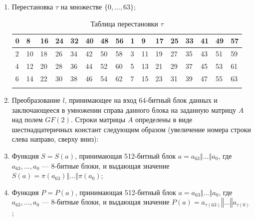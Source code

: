 \documentclass{./civarticle}
\begin{document}
\begin{enumerate}
    \item Перестановка $\tau$ на множестве $\{0, ..., 63 \}$;
    
    \begin{longtable}{|p{0.5cm}|p{0.5cm}|p{0.5cm}|p{0.5cm}|p{0.5cm}|p{0.5cm}|p{0.5cm}|p{0.5cm}|p{0.5cm}|p{0.5cm}|p{0.5cm}|p{0.5cm}|p{0.5cm}|p{0.5cm}|p{0.5cm}|p{0.5cm}|}
    \hline
    0 & 8 & 16 & 24 & 32 & 40 & 48 & 56 & 1 & 9 & 17 & 25 & 33 & 41 & 49 & 57 \\
    \hline
    2 & 10 & 18 & 26 & 34 & 42 & 50 & 58 & 3 & 11 & 19 & 27 & 35 & 43 & 51 & 59 \\
    \hline
    4 & 12 & 20 & 28 & 36 & 44 & 52 & 60 & 5 & 13 & 21 & 29 & 37 & 45 & 53 & 61 \\ 
    \hline
    6 & 14 & 22 & 30 & 38 & 46 & 54 & 62 & 7 & 15 & 23 & 31 & 39 & 47 & 55 & 63 \\
    \hline
    \caption{Таблица перестановки $\tau$}
    
    \end{longtable}

    \item Преобразование $l$, принимающее на вход 64-битный блок данных и заключающееся в умножении справа данного блока на заданную матрицу $A$ над полем $GF(2)$. Строки матрицы $A$ определены в виде шестнадцатеричных констант следующим образом (увеличение номера строки слева направо, сверху вниз):

    \begin{figure}[h!]
    \end{figure}

    \item Функция $S = S(a)$, принимающая 512-битный блок $a = a_{63} \mathbin\Vert ... \mathbin\Vert a_0$, где $a_{63}, ..., a_0$ --- 8-битные блоки, и выдающая значение $S(a) = \pi(a_{63}) \mathbin\Vert ... \mathbin\Vert \pi(a_0)$;

    \item Функция $P = P(a)$, принимающая 512-битный блок $a = a_{63} \mathbin\Vert ... \mathbin\Vert a_0$, где $a_{63}, ..., a_0$ --- 8-битные блоки, и выдающая значение $P(a) = a_{\tau(63)} \mathbin\Vert ... \mathbin\Vert a_{\tau(0)}$;


\end{enumerate}
\end{document}
